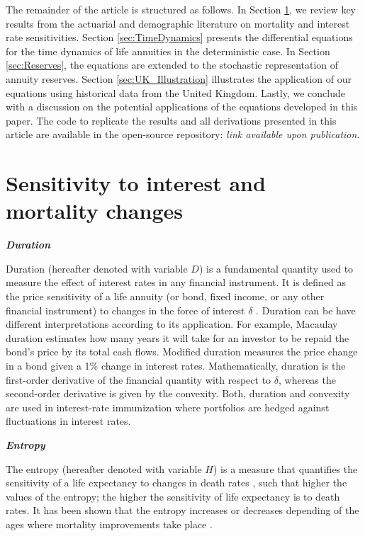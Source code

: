 \documentclass[12pt]{article}
\begin{document}
The remainder of the article is structured as follows. In Section \ref{sec:SensitivityMortalityInterest}, we review key results from the actuarial and demographic literature on mortality and interest rate sensitivities. Section \ref{sec:TimeDynamics} presents the differential equations for the time dynamics of life annuities in the deterministic case. In Section \ref{sec:Reserves}, the equations are extended to the stochastic representation of annuity reserves. Section \ref{sec:UK_Illustration} illustrates the application of our equations using historical data from the United Kingdom. Lastly, we conclude with a discussion on the potential applications of the equations developed in this paper. The code to replicate the results and all derivations presented in this article are available in the open-source repository: \textit{link available upon publication}.



\section{Sensitivity to interest and mortality changes}\label{sec:SensitivityMortalityInterest}

\textit{\textbf{Duration}}

 Duration (hereafter denoted with variable $D$) is a fundamental quantity used to measure the effect of interest rates in any financial instrument. It is defined as the price sensitivity of a life annuity (or bond, fixed income, or any other financial instrument) to changes in the force of interest $\delta$ \citep{milevsky2013life,charupat2016sluggish}. Duration can be have different interpretations according to its application. For example, Macaulay duration estimates how many years it will take for an investor to be repaid the bond's price by its total cash flows. Modified duration measures the price change in a bond given a 1\% change in interest rates. Mathematically, duration is the first-order derivative of the financial quantity with respect to $\delta$, whereas the second-order derivative is given by the convexity. Both, duration and convexity are used in interest-rate immunization \citep{redington1951papers,fisher1971coping,shiu1990redington,santomero1997financial,courtois2007immunization} where portfolios are hedged against fluctuations in interest rates.


\textit{\textbf{Entropy}}


The entropy (hereafter denoted with variable $H$) is a measure that quantifies the sensitivity of a life expectancy to changes in death rates \citep{leser1955variations,keyfitz1977difference,demetrius1974demographic,goldman1986new,Vaupel1986}, such that higher the values of the entropy; the higher the sensitivity of life expectancy is to death rates. It has been shown that the entropy increases or decreases depending of the ages where mortality improvements take place \citep{aburto2019threshold}.
\end{document}
